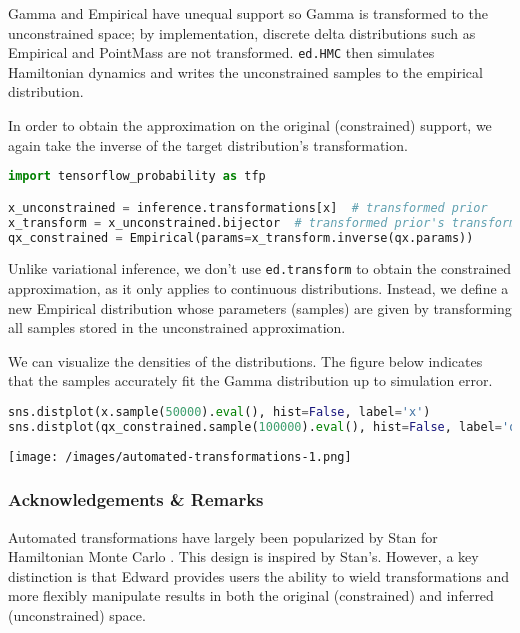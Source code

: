Gamma and Empirical have unequal support so Gamma is transformed to
the unconstrained space; by implementation, discrete delta
distributions such as Empirical and PointMass are not transformed.
\texttt{ed.HMC} then simulates Hamiltonian
dynamics and writes the unconstrained samples to the empirical
distribution.

In order to obtain the approximation on the original (constrained)
support, we again take the inverse of the target distribution's
transformation.

\begin{lstlisting}[language=Python]
import tensorflow_probability as tfp

x_unconstrained = inference.transformations[x]  # transformed prior
x_transform = x_unconstrained.bijector  # transformed prior's transformation
qx_constrained = Empirical(params=x_transform.inverse(qx.params))
\end{lstlisting}

Unlike variational inference, we don't use \texttt{ed.transform} to
obtain the constrained approximation, as it only applies to continuous
distributions. Instead, we define a new Empirical distribution whose
parameters (samples) are given by transforming all samples stored in
the unconstrained approximation.

We can visualize the densities of the distributions.
The figure below indicates that the samples accurately fit the Gamma
distribution up to simulation error.

\begin{lstlisting}[language=Python]
sns.distplot(x.sample(50000).eval(), hist=False, label='x')
sns.distplot(qx_constrained.sample(100000).eval(), hist=False, label='qx')
\end{lstlisting}

\texttt{[image: /images/automated-transformations-1.png]}

\subsubsection{Acknowledgements \& Remarks}

Automated transformations have largely been popularized by Stan
for Hamiltonian Monte Carlo \citep{carpenter2016stan}.
This design is inspired by Stan's. However, a key distinction is that Edward
provides users the ability to wield transformations and more flexibly
manipulate results in both the original (constrained) and inferred
(unconstrained) space.

